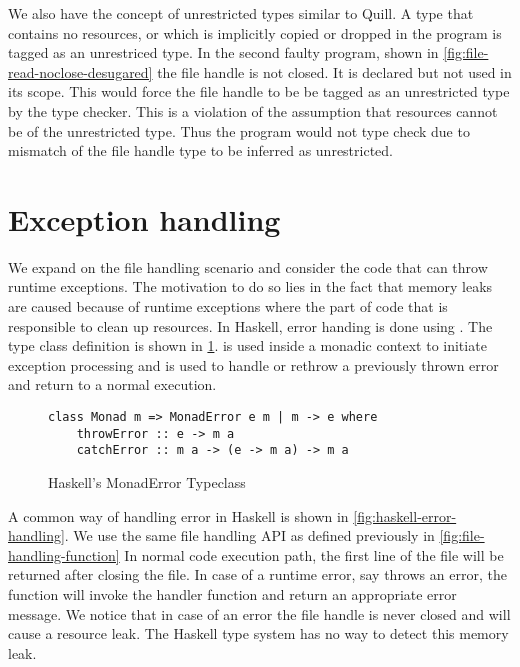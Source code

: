 We also have the concept of unrestricted types similar to Quill. A type that contains no resources, or which is implicitly
copied or dropped in the program is tagged as an unrestriced type. In the second faulty program,
shown in \cref{fig:file-read-noclose-desugared} the file handle  is not closed.
It is declared but not used in its scope. This would force the file handle to be be tagged as an unrestricted type by the \qub{} type checker.
This is a violation of the assumption that resources cannot be of the unrestricted type. Thus
the program would not type check due to mismatch of the file handle type to be inferred as unrestricted.

\section{Exception handling}
We expand on the file handling scenario and consider the code that can throw runtime exceptions.
The motivation to do so lies in the fact that memory leaks are caused because of runtime
exceptions where the part of code that is responsible to clean up resources. In Haskell, error handing is done using \citep{liang_monad_1995}.
The type class definition is shown in \cref{fig:haskell-monaderror}.  is used inside a monadic context to initiate
exception processing and  is used to handle or rethrow a previously thrown error and return
to a normal execution.

\begin{figure}[h]
  \begin{framed}
\begin{verbatim}
class Monad m => MonadError e m | m -> e where
    throwError :: e -> m a
    catchError :: m a -> (e -> m a) -> m a
\end{verbatim}
  \end{framed}
  \caption{Haskell's MonadError Typeclass}
  \label{fig:haskell-monaderror}
\end{figure}

\noindent
A common way of handling error in Haskell is shown in \cref{fig:haskell-error-handling}.
We use the same file handling API as defined previously in \cref{fig:file-handling-function}
In normal code execution path, the first line of the file will be returned after closing the file.
In case of a runtime error, say  throws an error, the  function will
invoke the handler function and return an appropriate error message. We notice that in case of an error the file handle 
is never closed and will cause a resource leak. The Haskell type system has no way to detect this memory leak.

